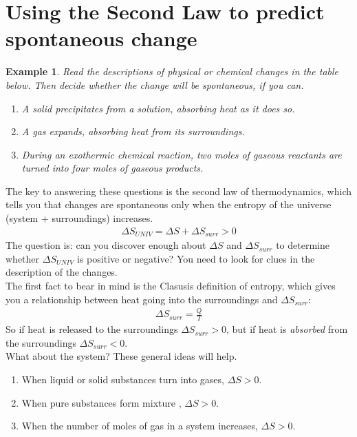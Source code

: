 \documentclass{article}  %
\newtheorem{exmp}{Example}
\begin{document}
\section*{Using the Second Law to predict spontaneous change}
\begin{exmp}
    Read the descriptions of physical or chemical changes in the table below. Then decide whether the change will be spontaneous, if you can.
    \begin{enumerate}
        \item A solid precipitates from a solution, absorbing heat as it does so.
        \item A gas expands, absorbing heat from its surroundings.
        \item During an exothermic chemical reaction, two moles of gaseous reactants are turned into four moles of gaseous products.
    \end{enumerate}
\end{exmp}
The key to answering these questions is the second law of thermodynamics, which tells you that changes are spontaneous only when the entropy of the universe (system + surroundings) increases.
\begin{equation*}
    \begin{aligned}
        \Delta S_{UNIV} = \Delta S + \Delta S_{surr} > 0
    \end{aligned}
\end{equation*}
The question is: can you discover enough about $\Delta S$ and $\Delta S_{surr}$ to determine whether $\Delta S_{UNIV}$ is positive or negative? You need to look for clues in the description of the changes.  \\
The first fact to bear in mind is the Clasusis definition of entropy, which gives you a relationship between heat going into the surroundings and $\Delta S_{surr}$:
\begin{equation*}
    \begin{aligned}
        \Delta S_{surr} = \frac{Q}{T}
    \end{aligned}
\end{equation*}
So if heat is released to the surroundings $\Delta S_{surr} > 0$, but if heat is \emph{absorbed} from the surroundings $\Delta S_{surr} < 0$. \\
What about the system? These general ideas will help.
\begin{enumerate}
    \item When liquid or solid substances turn into gases, $\Delta S > 0$.
    \item When pure substances form mixture , $\Delta S > 0$. 
    \item When the number of moles of gas in a system increases, $\Delta S > 0$. 
\end{enumerate}
\end{document}
